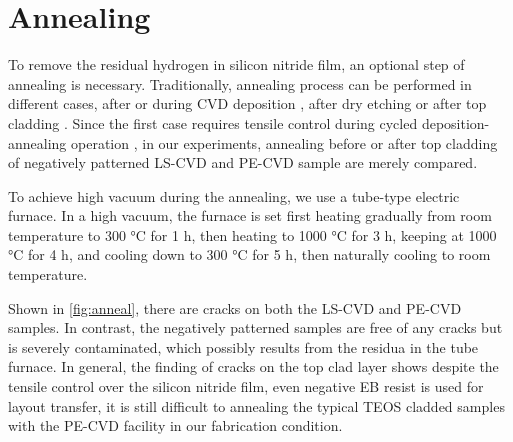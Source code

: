 \section{Annealing}

To remove the residual hydrogen in silicon nitride film, an optional step of annealing is necessary. 
Traditionally, annealing process can be performed in different cases, after or during CVD deposition \cite{Luke2013}, after dry etching or after top cladding \cite{Ang2018}. Since the first case requires tensile control during cycled deposition-annealing operation \cite{Luke2013}, in our experiments, annealing before or after top cladding of negatively patterned LS-CVD and PE-CVD sample are merely compared.

To achieve high vacuum during the annealing, we use a tube-type electric furnace. In a high vacuum, the furnace is set first heating gradually  from room temperature to 300 \si{\celsius} for 1 h, then heating to 1000 \si{\celsius} for 3 h, keeping at 1000 \si{\celsius} for 4 h, and cooling down to 300 \si{\celsius} for 5 h, then naturally cooling to room temperature. 

Shown in \autoref{fig:anneal}, there are cracks on both the LS-CVD and PE-CVD samples. In contrast, the negatively patterned samples are free of any cracks but is severely contaminated, which possibly results from the residua in the tube furnace. 
In general, the finding of cracks on the top clad layer shows despite the tensile control over the silicon nitride film, even negative EB resist is used for layout transfer, it is still difficult to annealing the typical TEOS cladded samples with the PE-CVD facility in our fabrication condition.

